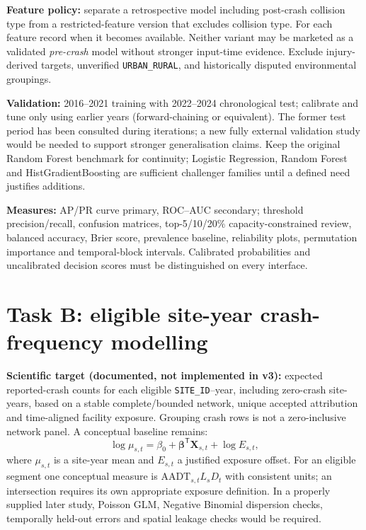 \documentclass[11pt,a4paper,openany]{report}
\newcommand{\pathcode}[1]{\nolinkurl{#1}}
\begin{document}
\textbf{Feature policy:} separate a retrospective model including post-crash collision type from a restricted-feature version that excludes collision type. For each feature record when it becomes available. Neither variant may be marketed as a validated \emph{pre-crash} model without stronger input-time evidence. Exclude injury-derived targets, unverified \pathcode{URBAN_RURAL}, and historically disputed environmental groupings.

\textbf{Validation:} 2016--2021 training with 2022--2024 chronological test; calibrate and tune only using earlier years (forward-chaining or equivalent). The former test period has been consulted during iterations; a new fully external validation study would be needed to support stronger generalisation claims. Keep the original Random Forest benchmark for continuity; Logistic Regression, Random Forest and HistGradientBoosting are sufficient challenger families until a defined need justifies additions.

\textbf{Measures:} AP/PR curve primary, ROC--AUC secondary; threshold precision/recall, confusion matrices, top-5/10/20\% capacity-constrained review, balanced accuracy, Brier score, prevalence baseline, reliability plots, permutation importance and temporal-block intervals. Calibrated probabilities and uncalibrated decision scores must be distinguished on every interface.

\section{Task B: eligible site-year crash-frequency modelling}
\textbf{Scientific target (documented, not implemented in v3):} expected reported-crash counts for each eligible \pathcode{SITE_ID}--year, including zero-crash site-years, based on a stable complete/bounded network, unique accepted attribution and time-aligned facility exposure. Grouping crash rows is not a zero-inclusive network panel. A conceptual baseline remains:
\begin{equation}\log \mu_{s,t}=\beta_0+\boldsymbol\beta^{\mathsf T}\mathbf X_{s,t}+\log E_{s,t},\end{equation}
where \(\mu_{s,t}\) is a site-year mean and \(E_{s,t}\) a justified exposure offset. For an eligible segment one conceptual measure is \(\mathrm{AADT}_{s,t}L_sD_t\) with consistent units; an intersection requires its own appropriate exposure definition. In a properly supplied later study, Poisson GLM, Negative Binomial dispersion checks, temporally held-out errors and spatial leakage checks would be required.
\end{document}
